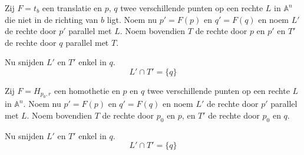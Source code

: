 \documentclass[main.tex]{subfiles}
\begin{document}
\begin{lem}
  Zij $F = t_{b}$ een translatie en $p$, $q$ twee verschillende punten op een rechte $L$ in $\mathbb{A}^{n}$ die niet in de richting van $b$ ligt.
  Noem nu $p' = F(p)$ en $q'= F(q)$ en noem $L'$ de rechte door $p'$ parallel met $L$.
  Noem bovendien $T$ de rechte door $p$ en $p'$ en $T'$ de rechte door $q$ parallel met $T$.

  Nu snijden $L'$ en $T'$ enkel in $q$.
  \[ L' \cap T' = \{q\} \]

\end{lem}

\begin{lem}
  Zij $F = H_{p_{0},r}$ een homothetie en $p$ en $q$ twee verschillende punten op een rechte $L$ in $\mathbb{A}^{n}$.
  Noem nu $p' = F(p)$ en $q'= F(q)$ en noem $L'$ de rechte door $p'$ parallel met $L$.
  Noem bovendien $T$ de rechte door $p_{0}$ en $p$, en $T'$ de rechte door $p_{0}$ en $q$.
  
  Nu snijden $L'$ en $T'$ enkel in $q$.
  \[ L' \cap T' = \{q\} \]

\end{lem}
\end{document}
